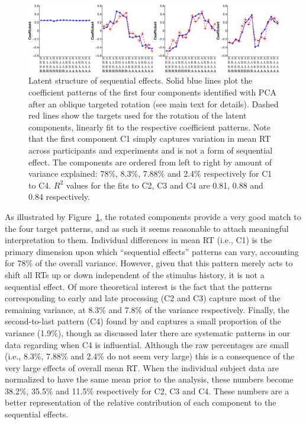\documentclass{apa}[12pt]
\begin{document}
\begin{figure}[t]
\centering
\includegraphics[width=1\textwidth]{component_fits_oblique.pdf}
\caption[Latent structure of sequential effects.]{Latent structure of sequential effects. Solid blue lines plot the coefficient patterns of the first four components identified with PCA after an oblique targeted rotation (see main text for details). Dashed red lines show the targets used for the rotation of the latent components, linearly fit to the respective coefficient patterns. Note that the first component C1 simply captures variation in mean RT across participants and experiments and is not a form of sequential effect. The components are ordered from left to right by amount of variance explained: 78\%, 8.3\%, 7.88\% and 2.4\% respectively for C1 to C4. $R^2$ values for the fits to C2, C3 and C4 are 0.81, 0.88 and 0.84 respectively.\label{component_fits}}
\end{figure}

As illustrated by Figure~\ref{component_fits}, the rotated components provide a very good match to the four target patterns, and as such it seems reasonable to attach meaningful interpretation to them. Individual differences in mean RT (i.e., C1) is the primary dimension upon which ``sequential effects'' patterns can vary, accounting for 78\% of the overall variance. However, given that this pattern merely acts to shift all RTs up or down independent of the stimulus history, it is not a sequential effect. Of more theoretical interest is the fact that the patterns corresponding to early and late processing (C2 and C3) capture most of the remaining variance, at 8.3\% and 7.8\% of the variance respectively. Finally, the second-to-last pattern (C4) found by  and  captures a small proportion of the variance (1.9\%), though as discussed later there are systematic patterns in our data regarding when C4 is influential. Although the raw percentages are small (i.e., 8.3\%, 7.88\% and 2.4\% do not seem very large) this is a consequence of the very large effects of overall mean RT. When the individual subject data are normalized to have the same mean prior to the analysis, these numbers become 38.2\%, 35.5\% and 11.5\% respectively for C2, C3 and C4. These numbers are a better representation of the relative contribution of each component to the sequential effects.
\end{document}
